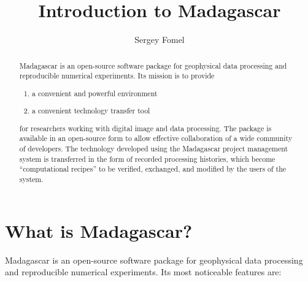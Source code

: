 \title{Introduction to Madagascar}
\author{Sergey Fomel}

\maketitle

\begin{abstract}

Madagascar is an open-source software package for geophysical data
processing and reproducible numerical experiments. Its mission is
to provide
\begin{enumerate}
\item a convenient and powerful environment
\item a convenient technology transfer tool
\end{enumerate}
for researchers working with digital image and data processing. The
package is available in an open-source form to allow effective
collaboration of a wide community of developers. The technology
developed using the Madagascar project management system is
transferred in the form of recorded processing histories, which become
``computational recipes'' to be verified, exchanged, and modified by
the users of the system.

\end{abstract}

\section{What is Madagascar?}

Madagascar is an open-source software package for geophysical data processing
and reproducible numerical experiments. Its most noticeable features are:

